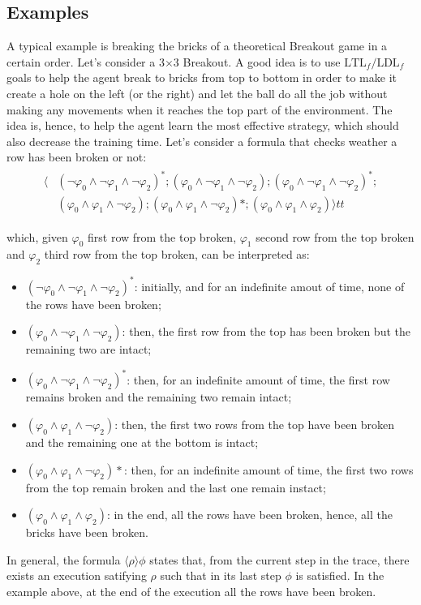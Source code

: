\subsection{Examples}
A typical example is breaking the bricks of a theoretical Breakout game in a
certain order. Let's consider a 3$\times$3 Breakout. A good idea is to use
$\text{LTL}_f/\text{LDL}_f$ goals to help the agent break to bricks from top
to bottom in order to make it create a hole on the left (or the right) and let
the ball do all the job without making any movements when it reaches the top
part of the environment. The idea is, hence, to help the agent learn
the most effective strategy, which should also decrease the training time.
Let's consider a formula that checks weather a row has been broken or not:
\begin{align}
\begin{split}
    \langle&(\neg\varphi_0 \land \neg\varphi_1 \land \neg\varphi_2)^*;
        (\varphi_0 \land \neg\varphi_1 \land \neg\varphi_2);
        (\varphi_0 \land \neg\varphi_1 \land \neg\varphi_2)^*;\\
        &(\varphi_0 \land \varphi_1 \land \neg\varphi_2);
        (\varphi_0 \land \varphi_1 \land \neg\varphi_2)*;
        (\varphi_0 \land \varphi_1 \land \varphi_2)\rangle tt
\end{split}
\end{align}

\noindent which, given $\varphi_0$ first row from the top broken,
$\varphi_1$ second row from the top broken and $\varphi_2$ third row from the
top broken, can be interpreted as:
\begin{itemize}
    \item $(\neg\varphi_0 \land \neg\varphi_1 \land \neg\varphi_2)^*$:
        initially, and for an indefinite amout of time, none of the rows have
        been broken;
    \item $(\varphi_0 \land \neg\varphi_1 \land \neg\varphi_2)$: then,
        the first row from the top has been broken but the remaining two
        are intact;
    \item $(\varphi_0 \land \neg\varphi_1 \land \neg\varphi_2)^*$: then,
        for an indefinite amount of time, the first row remains broken
        and the remaining two remain intact;
    \item $(\varphi_0 \land \varphi_1 \land \neg\varphi_2)$: then,
        the first two rows from the top have been broken and the remaining
        one at the bottom is intact;
    \item $(\varphi_0 \land \varphi_1 \land \neg\varphi_2)*$: then,
        for an indefinite amount of time, the first two rows from the top
        remain broken and the last one remain instact;
    \item $(\varphi_0 \land \varphi_1 \land \varphi_2)$: in the end,
        all the rows have been broken, hence, all the bricks have been broken.
\end{itemize}

In general, the formula $\langle\rho\rangle\phi$ states that, from the current step in
the trace, there exists an execution satifying $\rho$ such that in its last
step $\phi$ is satisfied. In the example above, at the end of the execution all
the rows have been broken.
